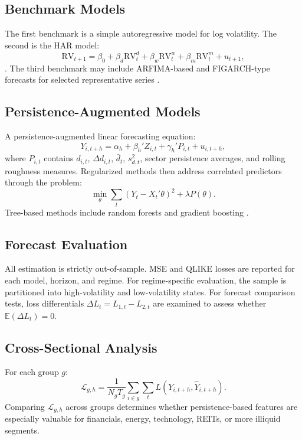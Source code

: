 \documentclass[12pt]{article}
\begin{document}
\subsection{Benchmark Models}

The first benchmark is a simple autoregressive model for log volatility. The second is the HAR model:
\[
\mathrm{RV}_{t+1} = \beta_0 + \beta_d \mathrm{RV}_t^d + \beta_w \mathrm{RV}_t^w + \beta_m \mathrm{RV}_t^m + u_{t+1},
\]
\citep{Corsi2009}. The third benchmark may include ARFIMA-based and FIGARCH-type forecasts for selected representative series \citep{Baillie1996, GrangerJoyeux1980, Hosking1981}.

\subsection{Persistence-Augmented Models}

A persistence-augmented linear forecasting equation:
\[
Y_{i,t+h} = \alpha_h + \beta_h' Z_{i,t} + \gamma_h' P_{i,t} + u_{i,t+h},
\]
where $P_{i,t}$ contains $d_{i,t}$, $\Delta d_{i,t}$, $\bar{d}_t$, $s_{d,t}^2$, sector persistence averages, and rolling roughness measures. Regularized methods \citep{Hastie2009} then address correlated predictors through the problem:
\[
\min_\theta \sum_t (Y_t - X_t' \theta)^2 + \lambda P(\theta).
\]
Tree-based methods include random forests \citep{Breiman2001} and gradient boosting \citep{Friedman2001}.

\subsection{Forecast Evaluation}

All estimation is strictly out-of-sample. MSE and QLIKE losses are reported for each model, horizon, and regime. For regime-specific evaluation, the sample is partitioned into high-volatility and low-volatility states. For forecast comparison tests, loss differentials $\Delta L_t = L_{1,t} - L_{2,t}$ are examined to assess whether $\mathbb{E}(\Delta L_t) = 0$.

\subsection{Cross-Sectional Analysis}

For each group $g$:
\[
\mathcal{L}_{g,h} = \frac{1}{N_g T_g}\sum_{i \in g}\sum_t L(Y_{i,t+h}, \hat{Y}_{i,t+h}).
\]
Comparing $\mathcal{L}_{g,h}$ across groups determines whether persistence-based features are especially valuable for financials, energy, technology, REITs, or more illiquid segments.
\end{document}
